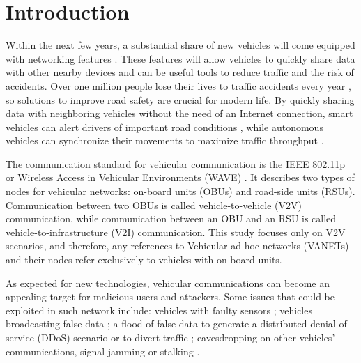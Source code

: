 \documentclass[conference]{IEEEtran}
\begin{document}

\IEEEpeerreviewmaketitle



\section{Introduction}
\label{section:introduction}

Within the next few years, a substantial share of new vehicles will come equipped with networking features \cite{connectedcar2016}.
These features will allow vehicles to quickly share data with other nearby devices and can be useful tools to reduce traffic and the risk of accidents.
Over one million people lose their lives to traffic accidents every year \cite{whotraffic}, so solutions to improve road safety are crucial for modern life.
By quickly sharing data with neighboring vehicles without the need of an Internet connection, smart vehicles can alert drivers of important road conditions \cite{barba2012smart}, while autonomous vehicles can synchronize their movements to maximize traffic throughput \cite{amoozadeh2015platoon}.

The communication standard for vehicular communication is the IEEE 802.11p or Wireless Access in Vehicular Environments (WAVE) \cite{jiang2008ieee}.
It describes two types of nodes for vehicular networks: on-board units (OBUs) and road-side units (RSUs).
Communication between two OBUs is called vehicle-to-vehicle (V2V) communication, while communication between an OBU and an RSU is called vehicle-to-infrastructure (V2I) communication.
This study focuses only on V2V scenarios, and therefore, any references to Vehicular ad-hoc networks (VANETs) and their nodes refer exclusively to vehicles with on-board units.

As expected for new technologies, vehicular communications can become an appealing target for malicious users and attackers.
Some issues that could be exploited in such network include: vehicles with faulty sensors \cite{isaac2010security}; vehicles broadcasting false data \cite{golle2004detecting}; a flood of false data to generate a distributed denial of service (DDoS) scenario or to divert traffic \cite{garip2015congestion}; eavesdropping on other vehicles' communications, signal jamming or stalking \cite{isaac2010security}. 
\end{document}
